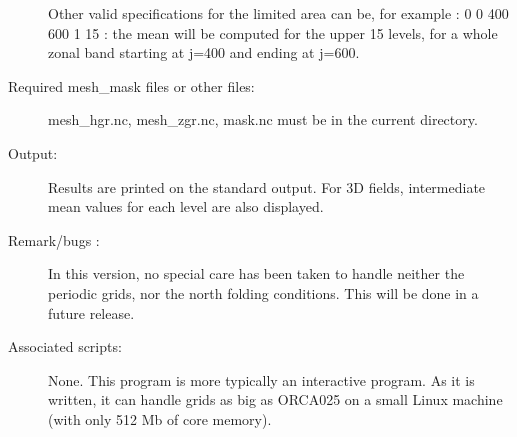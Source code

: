 \documentclass[a4paper,11pt]{article}
\begin{document}
\begin{description}
 Other valid specifications for the limited area 
can be, for example : 0 0  400 600 1 15 : the mean will be computed for the upper 15 levels, for a whole zonal band starting
at j=400 and ending at j=600.

\item[Required mesh\_mask files or other files:]   mesh\_hgr.nc, mesh\_zgr.nc, mask.nc must be in the current directory.
\item[Output:] Results are printed  on the standard output. For 3D fields, intermediate mean values for each level are also
displayed.
\item[Remark/bugs :] In this version, no special care has been taken to handle neither the periodic grids, nor the north folding conditions.
This will be done in a future release.
\item[Associated scripts:] {None. This program is more typically an interactive program. As it is written, it can handle grids as big
as ORCA025 on a small Linux machine (with only 512 Mb of core memory).}
\end{description}


\newpage
\end{document}
